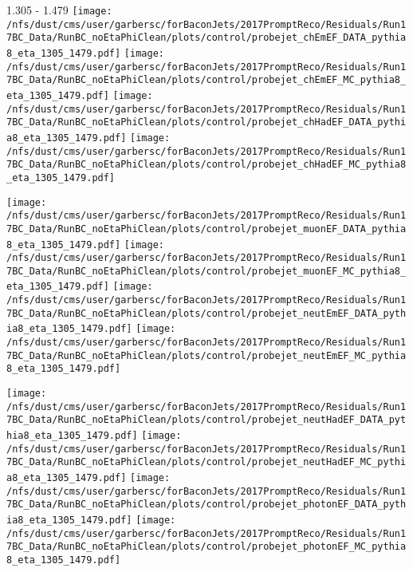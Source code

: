 \documentclass[t,compress]{beamer}
\begin{document}
\begin{frame}{1.305 - 1.479}
	\texttt{[image: /nfs/dust/cms/user/garbersc/forBaconJets/2017PromptReco/Residuals/Run17BC\_Data/RunBC\_noEtaPhiClean/plots/control/probejet\_chEmEF\_DATA\_pythia8\_eta\_1305\_1479.pdf]}
	\texttt{[image: /nfs/dust/cms/user/garbersc/forBaconJets/2017PromptReco/Residuals/Run17BC\_Data/RunBC\_noEtaPhiClean/plots/control/probejet\_chEmEF\_MC\_pythia8\_eta\_1305\_1479.pdf]}
	\texttt{[image: /nfs/dust/cms/user/garbersc/forBaconJets/2017PromptReco/Residuals/Run17BC\_Data/RunBC\_noEtaPhiClean/plots/control/probejet\_chHadEF\_DATA\_pythia8\_eta\_1305\_1479.pdf]}
	\texttt{[image: /nfs/dust/cms/user/garbersc/forBaconJets/2017PromptReco/Residuals/Run17BC\_Data/RunBC\_noEtaPhiClean/plots/control/probejet\_chHadEF\_MC\_pythia8\_eta\_1305\_1479.pdf]}
\newline

\vspace{-0.65cm}
	\texttt{[image: /nfs/dust/cms/user/garbersc/forBaconJets/2017PromptReco/Residuals/Run17BC\_Data/RunBC\_noEtaPhiClean/plots/control/probejet\_muonEF\_DATA\_pythia8\_eta\_1305\_1479.pdf]}
	\texttt{[image: /nfs/dust/cms/user/garbersc/forBaconJets/2017PromptReco/Residuals/Run17BC\_Data/RunBC\_noEtaPhiClean/plots/control/probejet\_muonEF\_MC\_pythia8\_eta\_1305\_1479.pdf]}
	\texttt{[image: /nfs/dust/cms/user/garbersc/forBaconJets/2017PromptReco/Residuals/Run17BC\_Data/RunBC\_noEtaPhiClean/plots/control/probejet\_neutEmEF\_DATA\_pythia8\_eta\_1305\_1479.pdf]}
	\texttt{[image: /nfs/dust/cms/user/garbersc/forBaconJets/2017PromptReco/Residuals/Run17BC\_Data/RunBC\_noEtaPhiClean/plots/control/probejet\_neutEmEF\_MC\_pythia8\_eta\_1305\_1479.pdf]}
\newline

\vspace{-0.65cm}
	\texttt{[image: /nfs/dust/cms/user/garbersc/forBaconJets/2017PromptReco/Residuals/Run17BC\_Data/RunBC\_noEtaPhiClean/plots/control/probejet\_neutHadEF\_DATA\_pythia8\_eta\_1305\_1479.pdf]}
	\texttt{[image: /nfs/dust/cms/user/garbersc/forBaconJets/2017PromptReco/Residuals/Run17BC\_Data/RunBC\_noEtaPhiClean/plots/control/probejet\_neutHadEF\_MC\_pythia8\_eta\_1305\_1479.pdf]}
	\texttt{[image: /nfs/dust/cms/user/garbersc/forBaconJets/2017PromptReco/Residuals/Run17BC\_Data/RunBC\_noEtaPhiClean/plots/control/probejet\_photonEF\_DATA\_pythia8\_eta\_1305\_1479.pdf]}
	\texttt{[image: /nfs/dust/cms/user/garbersc/forBaconJets/2017PromptReco/Residuals/Run17BC\_Data/RunBC\_noEtaPhiClean/plots/control/probejet\_photonEF\_MC\_pythia8\_eta\_1305\_1479.pdf]}
\end{frame}
\end{document}
